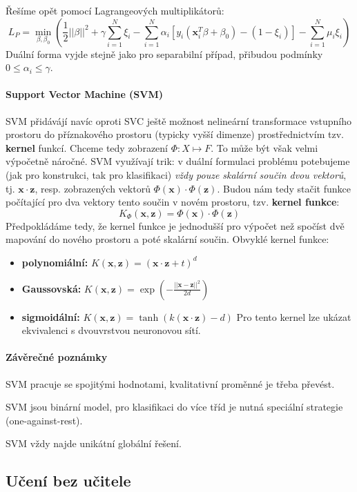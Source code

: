 \documentclass[11pt]{report} %
\renewcommand{\vec}[1]{\mathbf{#1}}
\numberwithin{equation}{section}
\begin{document}
Řešíme opět pomocí Lagrangeových multiplikátorů:
$$L_P = \min_{\beta,\beta_0}\left(\frac{1}{2}||\beta||^2 + \gamma\sum_{i=1}^{N}\xi_i  - \sum_{i=1}^{N} \alpha_i [y_i(\vec{x}_i^T\beta + \beta_0)- (1 - \xi_i )] - \sum_{i=1}^{N}\mu_i\xi_i\right)$$ 
Duální forma vyjde stejně jako pro separabilní případ, přibudou podmínky $0 \leq  \alpha_i \leq \gamma$.

\paragraph{Support Vector Machine (SVM)}
SVM přidávájí navíc oproti SVC ještě možnost nelineární transformace vstupního prostoru do příznakového prostoru (typicky vyšší dimenze) prostřednictvím tzv. \textbf{kernel} funkcí. Chceme tedy zobrazení $\Phi : X \mapsto F$. To může být však velmi výpočetně náročné. SVM využívají trik: v duální formulaci problému potebujeme (jak pro konstrukci, tak pro klasifikaci) \textit{vždy pouze skalární součin dvou vektorů}, tj. $\vec{x} \cdot \vec{z}$, resp. zobrazených vektorů $\Phi(\vec{x}) \cdot \Phi(\vec{z})$. Budou nám tedy stačit funkce počítající pro dva vektory tento součin v novém prostoru, tzv. \textbf{kernel funkce}:
$$K_\Phi(\vec{x},\vec{z}) = \Phi(\vec{x})\cdot\Phi(\vec{z})$$
Předpokládáme tedy, že kernel funkce je jednodušší pro výpočet než spočíst dvě mapování do nového prostoru a poté skalární součin.
Obvyklé kernel funkce:
\begin{itemize}
	\item \textbf{polynomiální:} $K(\vec{x},\vec{z}) = (\vec{x}\cdot\vec{z} + t)^d$
	\item \textbf{Gaussovská:} $K(\vec{x},\vec{z}) = \exp(-\frac{||\vec{x} - \vec{z}||^2}{2d})$
	\item \textbf{sigmoidální:} $K(\vec{x},\vec{z}) = \tanh(k(\vec{x}\cdot\vec{z})-d)$
	Pro tento kernel lze ukázat ekvivalenci s dvouvrstvou neuronovou sítí.
\end{itemize}

\paragraph{Závěrečné poznámky}
SVM pracuje se spojitými hodnotami, kvalitativní proměnné je třeba převést. 

SVM jsou binární model, pro klasifikaci do více tříd je nutná speciální strategie (one-against-rest).

SVM vždy najde unikátní globální řešení.


\subsection{Učení bez učitele}
\end{document}
